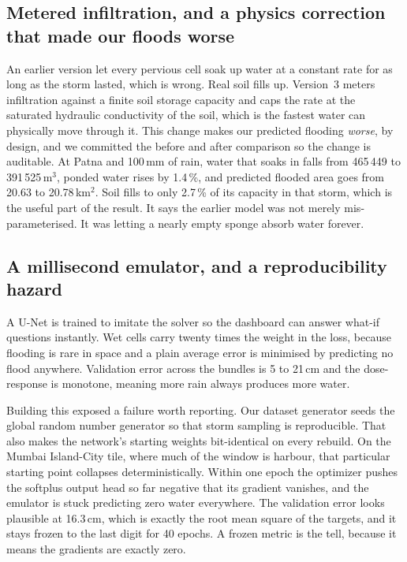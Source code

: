 \subsection{Metered infiltration, and a physics correction that made our floods worse}
An earlier version let every pervious cell soak up water at a constant rate for as long as the storm
lasted, which is wrong. Real soil fills up. Version~3 meters infiltration against a finite soil
storage capacity and caps the rate at the saturated hydraulic conductivity of the soil, which is
the fastest water can physically move through it. This change makes our predicted flooding
\emph{worse}, by design, and we committed the before and after comparison so the change is
auditable. At Patna and 100\,mm of rain, water that soaks in falls from 465\,449 to
391\,525\,m$^3$, ponded water rises by 1.4\,\%, and predicted flooded area goes from 20.63 to
20.78\,km$^2$. Soil fills to only 2.7\,\% of its capacity in that storm, which is the useful part
of the result. It says the earlier model was not merely mis-parameterised. It was letting a nearly
empty sponge absorb water forever.

\subsection{A millisecond emulator, and a reproducibility hazard}
A U-Net \cite{ronneberger2015} is trained to imitate the solver so the dashboard can answer what-if
questions instantly. Wet cells carry twenty times the weight in the loss, because flooding is rare
in space and a plain average error is minimised by predicting no flood anywhere. Validation error
across the bundles is 5 to 21\,cm and the dose-response is monotone, meaning more rain always
produces more water.

Building this exposed a failure worth reporting. Our dataset generator seeds the global random
number generator so that storm sampling is reproducible. That also makes the network's starting
weights bit-identical on every rebuild. On the Mumbai Island-City tile, where much of the window is
harbour, that particular starting point collapses deterministically. Within one epoch the optimizer
pushes the softplus output head so far negative that its gradient vanishes, and the emulator is
stuck predicting zero water everywhere. The validation error looks plausible at 16.3\,cm, which is
exactly the root mean square of the targets, and it stays frozen to the last digit for 40 epochs.
A frozen metric is the tell, because it means the gradients are exactly zero.

